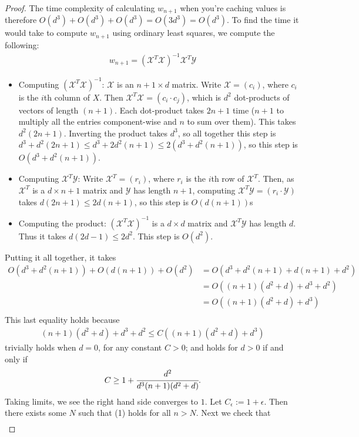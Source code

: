 \documentclass[12pt]{article}
\newcommand{\X}{\mathcal{X}}
\newcommand{\Y}{\mathcal{Y}}
\begin{document}
\begin{proof}
  The time complexity of calculating $w_{n+1}$ when you're caching values is therefore $O(d^3) + O(d^3) + O(d^3) = O(3d^3) = O(d^3)$.
\bigbreak
  To find the time it would take to compute $w_{n+1}$ using ordinary least squares, we compute the following:
\begin{align*}
  w_{n+1} = (\X^T\X)^{-1} \X^T \Y
\end{align*}
\begin{itemize}
\item
  Computing $(\X^T\X)^{-1}$: $\X$ is an $n+1 \times d$ matrix. Write $\X=(c_i)$, where $c_i$ is the $i$th column of $X$. Then $\X^T\X=(c_i\cdot c_j)$, which
  is $d^2$ dot-products of vectors of length $(n+1)$. Each dot-product takes $2n+1$ time ($n+1$ to multiply all the entries component-wise and $n$ to sum over them). This takes $d^2(2n+1)$. Inverting the product takes $d^3$, so all together this step is $d^3 + d^2(2n+1) \leq d^3 + 2d^2(n+1) \leq 2(d^3 + d^2(n+1))$, so this step is
  $O(d^3 + d^2(n+1))$.
\item
  Computing $\X^T\Y$: Write $\X^T = (r_i)$, where $r_i$ is the $i$th row of $\X^T$. Then, as $\X^T$ is a $d \times n+1$ matrix and $\Y$ has length $n+1$, computing $\X^T\Y = (r_i \cdot \Y)$ takes $d(2n+1) \leq 2d(n+1)$, so this step is $O(d(n+1))$s
\item
  Computing the product: $(\X^T\X)^{-1}$ is a $d \times d$ matrix and $\X^T\Y$ has length $d$. Thus it takes $d(2d-1) \leq 2d^2$. This step is $O(d^2)$.
\end{itemize}
Putting it all together, it takes
\begin{align*}
  O(d^3 + d^2(n+1)) + O(d(n+1)) + O(d^2) &= O(d^3 + d^2(n+1) + d(n+1) + d^2) \\
  &= O((n+1)(d^2 + d) + d^3 + d^2) \\
  &= O((n+1)(d^2 + d) + d^3) \\
\end{align*}
This last equality holds because
\begin{align}
  (n+1)(d^2+d) + d^3 + d^2 \leq C((n+1)(d^2+d)+d^3)
\end{align}
trivially holds when $d=0$, for any constant $C>0$; and holds for $d > 0$ if and only if
\begin{align*}
  C \geq 1 + \cfrac{d^2}{d^3(n+1)(d^2+d)}.
\end{align*}
Taking limits, we see the right hand side converges to $1$. Let $C_{\epsilon} := 1+\epsilon$. Then there exists some $N$ such that (1) holds for all $n > N$.
\bigbreak
  Next we check that
\begin{align*}

\end{align*}
\end{proof}
\end{document}
